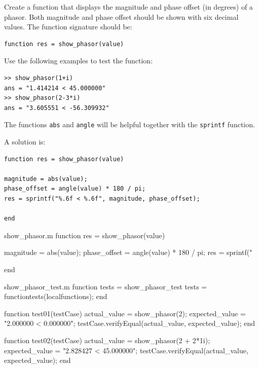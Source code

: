 \begin{ex}
Create a function that displays the magnitude and 
phase offset (in degrees) of a phasor.
Both magnitude and phase offset should be shown with six 
decimal values.
The function signature should be:
\begin{lstlisting}
function res = show_phasor(value)
\end{lstlisting}
Use the following examples to test the function:
\begin{lstlisting}
>> show_phasor(1+i)
ans = "1.414214 < 45.000000"
>> show_phasor(2-3*i)
ans = "3.605551 < -56.309932"
\end{lstlisting}
\begin{hint}
The functions \verb!abs! and \verb!angle! will be helpful together with the \verb!sprintf! function.
\end{hint}
\begin{sol}
A solution is:
\begin{lstlisting}
function res = show_phasor(value)

magnitude = abs(value);
phase_offset = angle(value) * 180 / pi;
res = sprintf("%.6f < %.6f", magnitude, phase_offset);

end
\end{lstlisting}
\end{sol}
\begin{solutionfile}{show_phasor.m}
function res = show_phasor(value)

magnitude = abs(value);
phase_offset = angle(value) * 180 / pi;
res = sprintf("%

end
\end{solutionfile}
\begin{solutionfile}{show_phasor_test.m}
function tests = show_phasor_test
    tests = functiontests(localfunctions);
end


function test01(testCase)
    actual_value = show_phasor(2);
    expected_value = "2.000000 < 0.000000";
    testCase.verifyEqual(actual_value, expected_value);
end

function test02(testCase)
    actual_value = show_phasor(2 + 2*1i);
    expected_value = "2.828427 < 45.000000";
    testCase.verifyEqual(actual_value, expected_value);
end
\end{solutionfile}
\end{ex}



